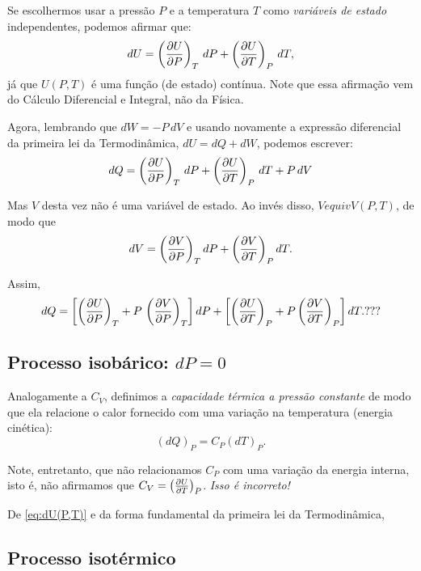 \documentclass[a4paper,12pt]{scrartcl}
\begin{document}
  Se escolhermos usar a pressão $P$ e a temperatura $T$ como \emph{variáveis de estado} independentes, podemos afirmar que:
  \begin{equation}\label{eq:dU(P,T)}
  dU = \left(\frac{\partial U}{\partial P}\right)_{T}\, dP + \left(\frac{\partial U}{\partial T}\right)_{P}\, dT,
  \end{equation}
  já que $U(P,T)$ é uma função (de estado) contínua. Note que essa afirmação vem do Cálculo Diferencial e Integral, não da Física.
  
  Agora, lembrando que $dW = -P\, dV$ e usando novamente a expressão diferencial da primeira lei da Termodinâmica, $dU = dQ + dW$, podemos escrever:
  \begin{equation*}
  dQ = \left(\frac{\partial U}{\partial P}\right)_{T}\, dP + \left(\frac{\partial U}{\partial T}\right)_{P}\, dT + P\, dV
  \end{equation*}
  
  Mas $V$ desta vez não é uma variável de estado. Ao invés disso, $V equiv V(P,T)$, de modo que
  \begin{equation}
  dV = \left(\frac{\partial V}{\partial P}\right)_{T} dP + \left(\frac{\partial V}{\partial T}\right)_{P} dT.
  \end{equation}
  
  Assim,
  \begin{equation*}
  dQ = \left[\left(\frac{\partial U}{\partial P}\right)_{T} + P\, \left(\frac{\partial V}{\partial P}\right)_{T}\right] dP + \left[\left(\frac{\partial U}{\partial T}\right)_{P} + P \left(\frac{\partial V}{\partial T}\right)_{P}\right] dT. ???
  \end{equation*}

  

  \subsection*{Processo isobárico: $dP = 0$}
  
  Analogamente a $C_V$, definimos a \emph{capacidade térmica a pressão constante} de modo que ela relacione o calor fornecido com uma variação na temperatura (energia cinética):
  \begin{equation}
  \left(dQ\right)_P = C_P\left(dT\right)_P.
  \end{equation}
  
  Note, entretanto, que não relacionamos $C_P$ com uma variação da energia interna, isto é, não afirmamos que $C_V = \left(\frac{\partial U}{\partial T}\right)_{P}$. \emph{Isso é incorreto!}
  
  De \eqref{eq:dU(P,T)} e da forma fundamental da primeira lei da Termodinâmica, 

  
  
  
  
  
  
  \subsection*{Processo isotérmico}
  
\end{document}
